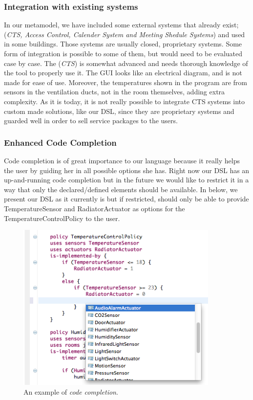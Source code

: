 \documentclass{llncs}
\begin{document}
\subsubsection{Integration with existing systems}\label{subsec:integration}
In our metamodel, we have included some external systems that already exist; (\textit{CTS, Access Control, Calender System and Meeting Shedule Systems}) and used in some buildings. Those systems are usually closed, proprietary systems. Some form of integration is possible to some of them, but would need to be evaluated case by case. The (\textit{CTS}) is somewhat advanced and needs thorough knowledge of the tool to properly use it. The GUI looks like an electrical diagram, and is not made for ease of use. Moreover, the temperatures shown in the program are from sensors in the ventilation ducts, not in the room themselves, adding extra complexity. As it is today, it is not really possible to integrate CTS systems into custom made solutions, like our DSL, since they are proprietary systems and guarded well in order to sell service packages to the users.

\subsubsection{Enhanced Code Completion}\label{subsec:codecompletion}
Code completion is of great importance to our language because it really helps the user by guiding her in all possible options she has. Right now our DSL has an up-and-running code completion but in the future we would like to restrict it in a way that only the declared/defined elements should be available. In  below, we present our DSL as it currently is but if restricted, should only be able to provide TemperatureSensor and RadiatorActuator as options for the TemperatureControlPolicy to the user.

\begin{figure}
  \centering
    \includegraphics[width=10cm]{dsl-code-completion.png} 
	\caption{An example of \textit{code completion}.}
	\label{fig:code-completion}
\end{figure}
\end{document}

